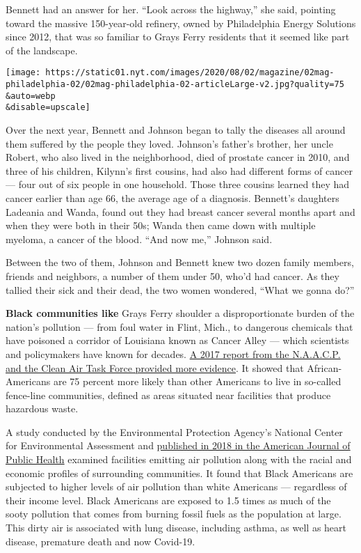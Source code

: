 Bennett had an answer for her. ``Look across the highway,'' she said,
pointing toward the massive 150-year-old refinery, owned by Philadelphia
Energy Solutions since 2012, that was so familiar to Grays Ferry
residents that it seemed like part of the landscape.

\texttt{[image: https://static01.nyt.com/images/2020/08/02/magazine/02mag-philadelphia-02/02mag-philadelphia-02-articleLarge-v2.jpg?quality=75\\\&auto=webp\\\&disable=upscale]}

Over the next year, Bennett and Johnson began to tally the diseases all
around them suffered by the people they loved. Johnson's father's
brother, her uncle Robert, who also lived in the neighborhood, died of
prostate cancer in 2010, and three of his children, Kilynn's first
cousins, had also had different forms of cancer --- four out of six
people in one household. Those three cousins learned they had cancer
earlier than age 66, the average age of a diagnosis. Bennett's daughters
Ladeania and Wanda, found out they had breast cancer several months
apart and when they were both in their 50s; Wanda then came down with
multiple myeloma, a cancer of the blood. ``And now me,'' Johnson said.

Between the two of them, Johnson and Bennett knew two dozen family
members, friends and neighbors, a number of them under 50, who'd had
cancer. As they tallied their sick and their dead, the two women
wondered, ``What we gonna do?''

\textbf{Black communities like} Grays Ferry shoulder a disproportionate
burden of the nation's pollution --- from foul water in Flint, Mich., to
dangerous chemicals that have poisoned a corridor of Louisiana known as
Cancer Alley --- which scientists and policymakers have known for
decades.
\href{https://www.naacp.org/wp-content/uploads/2017/11/Fumes-Across-the-Fence-Line_NAACP-and-CATF-Study.pdf}{A
2017 report from the N.A.A.C.P. and the Clean Air Task Force provided
more evidence}. It showed that African-Americans are 75 percent more
likely than other Americans to live in so-called fence-line communities,
defined as areas situated near facilities that produce hazardous waste.

A study conducted by the Environmental Protection Agency's National
Center for Environmental Assessment and
\href{https://mail.google.com/mail/u/0/\#inbox/FMfcgxwJXCCfnFTwVGjRcSPbJCghDlCL}{published
in 2018 in the American Journal of Public Health} examined facilities
emitting air pollution along with the racial and economic profiles of
surrounding communities. It found that Black Americans are subjected to
higher levels of air pollution than white Americans --- regardless of
their income level. Black Americans are exposed to 1.5 times as much of
the sooty pollution that comes from burning fossil fuels as the
population at large. This dirty air is associated with lung disease,
including asthma, as well as heart disease, premature death and now
Covid-19.

